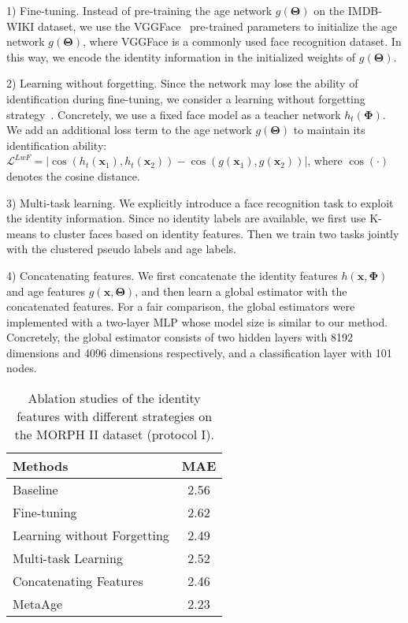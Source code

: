 \documentclass[journal,twoside]{IEEEtran}
\begin{document}
1) Fine-tuning. Instead of pre-training the age network $g(\bm{\Theta})$ on the IMDB-WIKI dataset, we use the  VGGFace~\cite{parkhi2015deep} pre-trained parameters to initialize the age network $g(\bm{\Theta})$, where VGGFace is a commonly used face recognition dataset. In this way, we encode the identity information in the initialized weights of $g(\bm{\Theta})$.


2) Learning without forgetting. Since the network may lose the ability of identification during fine-tuning, we consider a learning without forgetting strategy~\cite{li2017learningwf}. Concretely, we use a fixed face model as a teacher network $h_t(\bm{\Phi})$. We add an additional loss term to the age network $g(\bm{\Theta})$ to maintain its identification ability: $\mathcal{L}^{LwF} = |\cos(h_t(\bm{x}_1),h_t(\bm{x}_2)) - \cos(g(\bm{x}_1),g(\bm{x}_2)) |$, where $\cos(\cdot)$ denotes the cosine distance.

3) Multi-task learning. We explicitly introduce a face recognition task to exploit the identity information. Since no identity labels are available, we first use K-means to cluster faces based on identity features. Then we train two tasks jointly with the clustered pseudo labels and age labels.

4) Concatenating features. We first concatenate the identity features $h(\bm{x},\bm{\Phi})$ and age features $g(\bm{x},\bm{\Theta})$, and then learn a global estimator with the concatenated features. For a fair comparison, the global estimators were implemented with a two-layer MLP whose model size is similar to our method. Concretely, the global estimator consists of two hidden layers with 8192 dimensions and 4096 dimensions respectively, and a classification layer with 101 nodes.

\begin{table}[t]
\caption{Ablation studies of the identity features with different strategies on the MORPH II dataset (protocol I).}
\renewcommand\tabcolsep{25pt}
\label{table:identityfeature}
\centering
\begin{tabular}{lc}
\toprule
Methods  & MAE \\
\midrule
Baseline & 2.56  \\
\midrule
Fine-tuning & 2.62  \\
Learning without Forgetting & 2.49 \\
Multi-task Learning & 2.52 \\
Concatenating Features & 2.46 \\
\midrule
MetaAge & 2.23 \\
\bottomrule
\end{tabular}
\end{table}
\end{document}
